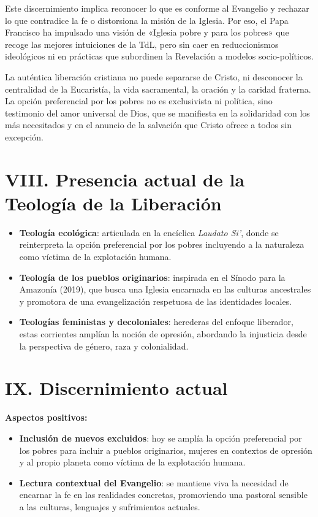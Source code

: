 \documentclass[12pt]{article}
\begin{document}
Este discernimiento implica reconocer lo que es conforme al Evangelio y rechazar lo que contradice la fe o distorsiona la misión de la Iglesia. Por eso, el Papa Francisco ha impulsado una visión de «Iglesia pobre y para los pobres» que recoge las mejores intuiciones de la TdL, pero sin caer en reduccionismos ideológicos ni en prácticas que subordinen la Revelación a modelos socio-políticos.

La auténtica liberación cristiana no puede separarse de Cristo, ni desconocer la centralidad de la Eucaristía, la vida sacramental, la oración y la caridad fraterna. La opción preferencial por los pobres no es exclusivista ni política, sino testimonio del amor universal de Dios, que se manifiesta en la solidaridad con los más necesitados y en el anuncio de la salvación que Cristo ofrece a todos sin excepción.

\section*{VIII. Presencia actual de la Teología de la Liberación}
\begin{itemize}
    \item \textbf{Teología ecológica}: articulada en la encíclica \textit{Laudato Si’}, donde se reinterpreta la opción preferencial por los pobres incluyendo a la naturaleza como víctima de la explotación humana.
    \item \textbf{Teología de los pueblos originarios}: inspirada en el Sínodo para la Amazonía (2019), que busca una Iglesia encarnada en las culturas ancestrales y promotora de una evangelización respetuosa de las identidades locales.
    \item \textbf{Teologías feministas y decoloniales}: herederas del enfoque liberador, estas corrientes amplían la noción de opresión, abordando la injusticia desde la perspectiva de género, raza y colonialidad.
\end{itemize}

\section*{IX. Discernimiento actual}
\textbf{Aspectos positivos:}
\begin{itemize}
    \item \textbf{Inclusión de nuevos excluidos}: hoy se amplía la opción preferencial por los pobres para incluir a pueblos originarios, mujeres en contextos de opresión y al propio planeta como víctima de la explotación humana.
    \item \textbf{Lectura contextual del Evangelio}: se mantiene viva la necesidad de encarnar la fe en las realidades concretas, promoviendo una pastoral sensible a las culturas, lenguajes y sufrimientos actuales.
\end{itemize}
\end{document}
